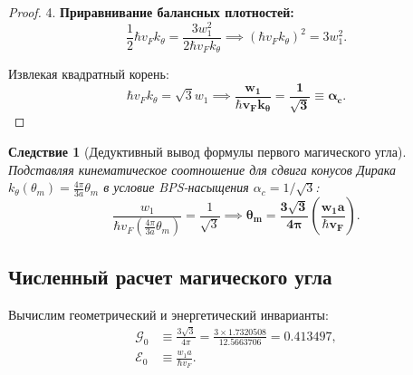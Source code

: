 \documentclass[12pt,a4paper]{article}
\newtheorem{corollary}{Следствие}
\begin{document}
\begin{proof}
		4. \textbf{Приравнивание балансных плотностей:}\\
		\begin{equation}
			\frac{1}{2} \hbar v_F k_\theta = \frac{3 w_1^2}{2 \hbar v_F k_\theta} \implies (\hbar v_F k_\theta)^2 = 3 w_1^2.
		\end{equation}
		
		Извлекая квадратный корень:
		\begin{equation}
			\hbar v_F k_\theta = \sqrt{3} w_1 \implies \mathbf{\frac{w_1}{\hbar v_F k_\theta} = \frac{1}{\sqrt{3}} \equiv \alpha_c}.
		\end{equation}
	\end{proof}
	
	\begin{corollary}[Дедуктивный вывод формулы первого магического угла]
		Подставляя кинематическое соотношение для сдвига конусов Дирака $k_\theta(\theta_m) = \frac{4\pi}{3 a} \theta_m$ в условие BPS-насыщения $\alpha_c = 1/\sqrt{3}$:
		\begin{equation}
			\frac{w_1}{\hbar v_F \left( \frac{4\pi}{3 a} \theta_m \right)} = \frac{1}{\sqrt{3}} \implies \mathbf{\theta_m = \frac{3\sqrt{3}}{4\pi} \left( \frac{w_1 a}{\hbar v_F} \right)}.
		\end{equation}
	\end{corollary}
	
	\subsection{Численный расчет магического угла}
	Вычислим геометрический и энергетический инварианты:
	\begin{align}
		\mathcal{G}_0 &\equiv \frac{3\sqrt{3}}{4\pi} = \frac{3 \times 1.7320508}{12.5663706} = \mathbf{0.413497}, \\
		\mathcal{E}_0 &\equiv \frac{w_1 a}{\hbar v_F}.
	\end{align}
	
\end{document}
